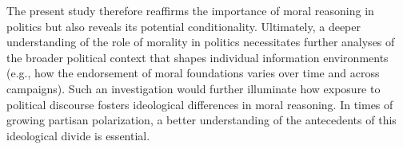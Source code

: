 \documentclass[12pt]{article}
\begin{document}
The present study therefore reaffirms the importance of moral reasoning in politics but also reveals its potential conditionality. Ultimately, a deeper understanding of the role of morality in politics necessitates further analyses of the broader political context that shapes individual information environments (e.g., how the endorsement of moral foundations varies over time and across campaigns). Such an investigation would further illuminate how exposure to political discourse fosters ideological differences in moral reasoning. In times of growing partisan polarization, a better understanding of the antecedents of this ideological divide is essential.



\end{document}
